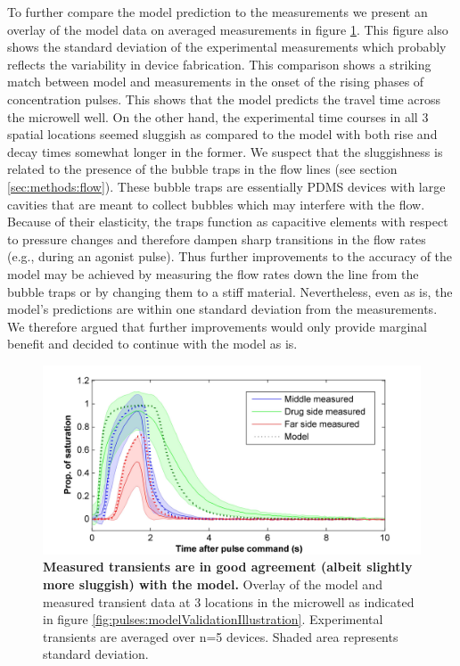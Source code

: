   To further compare the model prediction to the measurements we present an overlay of the model data on averaged measurements in figure \ref{fig:pulses:modelValidation}. This figure also shows the standard deviation of the experimental measurements which probably reflects the variability in device fabrication. This comparison shows a striking match between model and measurements in the onset of the rising phases of concentration pulses. This shows that the model predicts the travel time across the microwell well. On the other hand, the experimental time courses in all 3 spatial locations seemed sluggish as compared to the model with both rise and decay times somewhat longer in the former. We suspect that the sluggishness is related to the presence of the bubble traps in the flow lines (see section \ref{sec:methods:flow}). These bubble traps are essentially PDMS devices with large cavities that are meant to collect bubbles which may interfere with the flow. Because of their elasticity, the traps function as capacitive elements with respect to pressure changes and therefore dampen sharp transitions in the flow rates (e.g., during an agonist pulse). Thus further improvements to the accuracy of the model may be achieved by measuring the flow rates down the line from the bubble traps or by changing them to a stiff material. Nevertheless, even as is, the model's predictions are within one standard deviation from the measurements. We therefore argued that further improvements would only provide marginal benefit and decided to continue with the model as is.

  \begin{figure}[!htb]
       \centering
       \includegraphics[width=15cm]{chapter6/figures/modelValidation/modelValidation.jpg}
       \caption[Comparison between model predictions and measured agonist time course including variability between devices]{\textbf{Measured transients are in good agreement (albeit slightly more sluggish) with the model.} Overlay of the model and measured transient data at 3 locations in the microwell as indicated in figure \ref{fig:pulses:modelValidationIllustration}. Experimental transients are averaged over n=5 devices. Shaded area represents standard deviation.}
       \label{fig:pulses:modelValidation}
  \end{figure}

